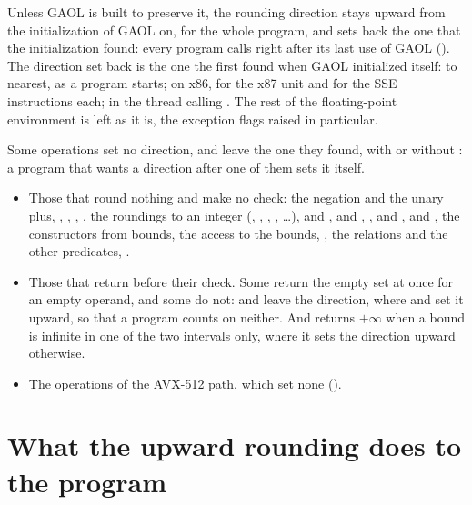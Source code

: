 \medskip
Unless GAOL is built to preserve it, the rounding direction stays upward from
the initialization of GAOL on, for the whole program, and 
sets back the one that the initialization found: every program calls
 right after its last use of GAOL
().\newinvfive{} The direction set back is the one the first
 found when GAOL initialized itself: to nearest, as a program
starts; on x86, for the x87 unit and for the SSE instructions each; in the
thread calling . The rest of the floating-point environment is
left as it is, the exception flags raised in particular.
%

\medskip
Some operations set no direction, and leave the one they found, with or
without : a program that wants a direction
after one of them sets it itself.\newinvfive
{}%
\begin{itemize}
\item Those that round nothing and make no check: the negation and the unary
  plus, , , , , the roundings
  to an integer (, , ,
  , \ldots), \code{\&} and
  \code{|},  and , ,
   and ,  and
  , the constructors from bounds, the access to the
  bounds, , the relations and the other predicates,
  .
\item Those that return before their check. Some return the empty set at once
  for an empty operand, and some do not:  and
   leave the direction, where  and
   set it upward, so that a program counts on neither. And
   returns $+\infty$ when a bound is infinite in one of
  the two intervals only, where it sets the direction upward otherwise.
\item The operations of the AVX-512 path, which set none
  ().
\end{itemize}

\section{What the upward rounding does to the \texorpdfstring{\mbox{program}}{program}}
\label{sec:upward-effects}
%

